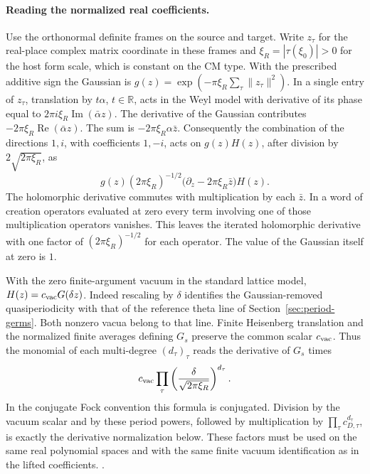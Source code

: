 \paragraph{Reading the normalized real coefficients.}
Use the orthonormal definite frames on the source and target.
Write \(z_\tau\) for the real-place complex matrix coordinate
in these frames and \(\xi_R=|\tau(\xi_0)|>0\) for the host
form scale, which is constant on the CM type. With the
prescribed additive sign the Gaussian is
\(g(z)=\exp(-\pi\xi_R\sum_\tau\|z_\tau\|^2)\).
In a single entry of \(z_\tau\), translation by \(t\alpha\),
\(t\in\mathbb R\), acts in the Weyl model with derivative of
its phase equal to \(2\pi i\xi_R\operatorname{Im}(\bar\alpha z)\).
The derivative of the Gaussian contributes
\(-2\pi\xi_R\operatorname{Re}(\bar\alpha z)\).
The sum is \(-2\pi\xi_R\alpha\bar z\).
Consequently the combination of the directions \(1,i\),
with coefficients \(1,-i\), acts on \(g(z)H(z)\), after
division by \(2\sqrt{2\pi\xi_R}\), as
\[
 g(z)(2\pi\xi_R)^{-1/2}
       \bigl(\partial_z-2\pi\xi_R\bar z\bigr)H(z).
\]
The holomorphic derivative commutes with multiplication by
each \(\bar z\). In a word of creation operators evaluated at
zero every term involving one of those multiplication
operators vanishes. This leaves the iterated holomorphic
derivative with one factor of \((2\pi\xi_R)^{-1/2}\) for each
operator. The value of the Gaussian itself at zero is \(1\).

With the zero finite-argument vacuum in the standard lattice
model, \(H(z)=c_{\rm vac}G(\delta z)\). Indeed rescaling by
\(\delta\) identifies the Gaussian-removed quasiperiodicity
with that of the reference theta line of
Section~\ref{sec:period-germs}. Both nonzero vacua belong
to that line. Finite Heisenberg translation and the normalized
finite averages defining \(G_s\) preserve the common scalar
\(c_{\rm vac}\). Thus the monomial of each multi-degree
\((d_\tau)_\tau\) reads the derivative of \(G_s\) times
\[
 c_{\rm vac}\prod_\tau
    \left(\frac{\delta}{\sqrt{2\pi\xi_R}}\right)^{d_\tau}.
\]
In the conjugate Fock convention this formula is conjugated.
Division by the vacuum scalar and by these period powers,
followed by multiplication by \(\prod_\tau c_{D,\tau}^{d_\tau}\),
is exactly the derivative normalization below. These factors
must be used on the same real polynomial spaces and with
the same finite vacuum identification as in the lifted
coefficients.
.

